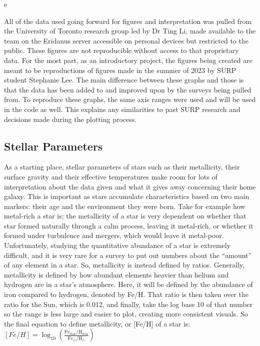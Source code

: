 e\documentclass{article}
\begin{document}
\indent All of the data used going forward for figures and interpretation was pulled from the University of Toronto research group led by Dr Ting Li, made available to the team on the Eridanus server accessible on personal devices but restricted to the public. These figures are not reproducible without access to that proprietary data. For the most part, as an introductory project, the figures being created are meant to be reproductions of figures made in the summer of 2023 by SURP student Stephanie Lee. The main difference between these graphs and those is that the data has been added to and improved upon by the surveys being pulled from. To reproduce these graphs, the same axis ranges were used and will be used in the code as well. This explains any similarities to past SURP research and decisions made during the plotting process.\\

\subsection*{Stellar Parameters}
\indent As a starting place, stellar parameters of stars such as their metallicity, their surface gravity and their effective temperatures make room for lots of interpretation about the data given and what it gives away concerning their home galaxy. This is important as stars accumulate characteristics based on two main markers: their age and the environment they were born. Take for example how metal-rich a star is; the metallicity of a star is very dependent on whether that star formed naturally through a calm process, leaving it metal-rich, or whether it formed under turbulence and mergers, which would leave it metal-poor. Unfortunately, studying the quantitative abundance of a star is extremely difficult, and it is very rare for a survey to put out numbers about the “amount” of any element in a star. So, metallicity is instead defined by ratios. Generally, metallicity is defined by how abundant elements heavier than helium and hydrogen are in a star's atmosphere. Here, it will be defined by the abundance of iron compared to hydrogen, denoted by Fe/H. That ratio is then taken over the ratio for the Sun, which is 0.012, and finally, take the log base 10 of that number so the range is less large and easier to plot, creating more consistent visuals. So the final equation to define metallicity, or [Fe/H] of a star is:\\

$[Fe/H] = \log_{10} \left( \frac{{\text{Fe}_{\text{star}} / \text{H}_{\text{star}}}}{{\text{Fe}_{\odot} / \text{H}_{\odot}}} \right)
$\\
\end{document}

